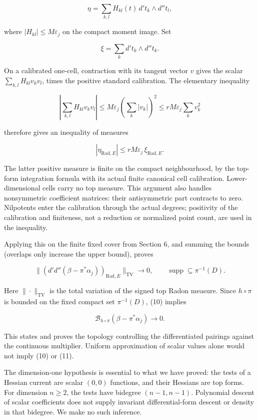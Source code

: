 \documentclass[
  11pt,
]{article}
\begin{document}
\[\eta=\sum_{k,l} H_{kl}(t)\,d't_k\wedge d''t_l,\]

where \(|H_{kl}|\leq M\varepsilon_j\) on the compact moment image. Set

\[\xi=\sum_k d't_k\wedge d''t_k.\]

On a calibrated one-cell, contraction with its tangent vector \(v\)
gives the scalar \(\sum_{k,l}H_{kl}v_kv_l\), times the positive standard
calibration. The elementary inequality

\[
\left|\sum_{k,l}H_{kl}v_kv_l\right|
\leq M\varepsilon_j\left(\sum_k|v_k|\right)^2
\leq rM\varepsilon_j\sum_k v_k^2
\]

therefore gives an inequality of measures

\[|\eta_{\mathrm{Rad},E}|\leq rM\varepsilon_j\,\xi_{\mathrm{Rad},E}.\]

The latter positive measure is finite on the compact neighbourhood, by
the top-form integration formula with its actual finite canonical cell
calibration. Lower-dimensional cells carry no top measure. This argument
also handles nonsymmetric coefficient matrices: their antisymmetric part
contracts to zero. Nilpotents enter the calibration through the actual
degrees; positivity of the calibration and finiteness, not a reduction
or normalized point count, are used in the inequality.

Applying this on the finite fixed cover from Section 6, and summing the
bounds (overlaps only increase the upper bound), proves

\[
\bigl\|(d'd''(\beta-\pi^*\alpha_j))_{\mathrm{Rad},E}\bigr\|_{\mathrm{TV}}
\longrightarrow0,\qquad
\operatorname{supp}\subseteq\pi^{-1}(D). \tag{10}
\]

Here \(\|\cdot\|_{\mathrm{TV}}\) is the total variation of the signed
top Radon measure. Since \(h\circ\pi\) is bounded on the fixed compact
set \(\pi^{-1}(D)\), (10) implies

\[\mathcal B_{h\circ\pi}(\beta-\pi^*\alpha_j)\longrightarrow0. \tag{11}\]

This states and proves the topology controlling the differentiated
pairings against the continuous multiplier. Uniform approximation of
scalar values alone would not imply (10) or (11).

The dimension-one hypothesis is essential to what we have proved: the
tests of a Hessian current are scalar \((0,0)\) functions, and their
Hessians are top forms. For dimension \(n\geq2\), the tests have
bidegree \((n-1,n-1)\). Polynomial descent of scalar coefficients does
not supply invariant differential-form descent or density in that
bidegree. We make no such inference.
\end{document}
